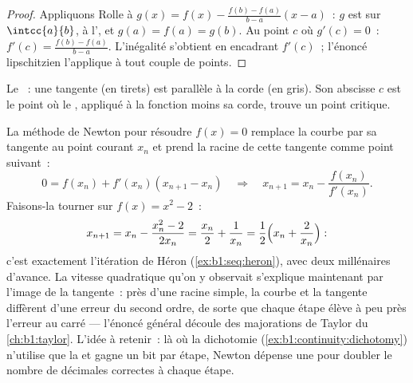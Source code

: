 \begin{proof}
Appliquons Rolle à $g(x) = f(x) - \frac{f(b) - f(a)}{b - a}(x - a)$~: $g$
est  sur $\intcc{a}{b}$,  à l', et $g(a) =
f(a) = g(b)$. Au point $c$ où $g'(c) = 0$~: $f'(c) =
\frac{f(b)-f(a)}{b-a}$. L'inégalité s'obtient en encadrant $f'(c)$~;
l'énoncé lipschitzien l'applique à tout couple de points.
\end{proof}

\begin{omfigure}

{\small Le ~: une tangente (en tirets) est
parallèle à la corde (en gris). Son abscisse $c$ est le point où le , appliqué à la fonction moins sa corde, trouve un point critique.}
\end{omfigure}

\begin{example}\label{ex:b1:derivative:newton}
La méthode de Newton pour résoudre $f(x) = 0$ remplace la courbe par
sa tangente au point courant $x_n$ et prend la racine de cette
tangente comme point suivant~:
\[
0 = f(x_n) + f'(x_n)(x_{n+1} - x_n)
\quad\Longrightarrow\quad
x_{n+1} = x_n - \frac{f(x_n)}{f'(x_n)} .
\]
Faisons-la tourner sur $f(x) = x^2 - 2$~:
\[
x_{n+1} = x_n - \frac{x_n^2 - 2}{2x_n}
= \frac{x_n}{2} + \frac{1}{x_n}
= \frac12\Bigl(x_n + \frac{2}{x_n}\Bigr) :
\]
c'est exactement l'itération de Héron (\cref{ex:b1:seq:heron}), avec deux
millénaires d'avance. La vitesse quadratique qu'on y observait s'explique
maintenant par l'image de la tangente~: près d'une racine simple, la courbe et
la tangente diffèrent d'une erreur du second ordre, de sorte que chaque étape
élève à peu près l'erreur au carré --- l'énoncé général découle des
majorations de Taylor du \cref{ch:b1:taylor}. L'idée à retenir~:
là où la dichotomie (\cref{ex:b1:continuity:dichotomy}) n'utilise que
la  et gagne un bit par étape, Newton dépense une
 pour doubler le nombre de décimales correctes à chaque étape.
\end{example}

